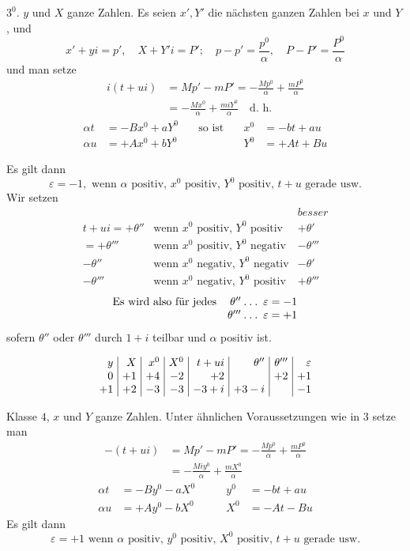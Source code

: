 $3^0$. $y$ und $X$ ganze Zahlen. Es seien $x',Y'$ die nächsten ganzen Zahlen bei $x$ und $Y$, und
\[
x'+yi=p',\quad X+Y'i=P';\quad p-p'=\frac{p^0}{\alpha},\quad P-P'=\frac{P^0}{\alpha}
\]
und man setze
\[
\begin{aligned}
i(t+ui)&=Mp'-mP'=-\frac{Mp^0}{\alpha}+\frac{mP^0}{\alpha}\\
&=-\frac{Mx^0}{\alpha}+\frac{miY^0}{\alpha}\quad\text{d. h.}
\end{aligned}
\]
\[
\begin{alignedat}{3}
\alpha t&=-Bx^0+aY^0\quad&\text{so ist}\quad&x^0&=-bt+au\\
\alpha u&=+Ax^0+bY^0&&Y^0&=+At+Bu
\end{alignedat}
\]

Es gilt dann
\[
\varepsilon=-1,\text{ wenn }\alpha\text{ positiv, }x^0\text{ positiv, }Y^0\text{ positiv, }t+u\text{ gerade usw.}
\]
Wir setzen
\[
\begin{array}{rll}
&&\textit{besser}\\
t+ui=+\theta''&\text{wenn }x^0\text{ positiv, }Y^0\text{ positiv}&+\theta'\\
=+\theta'''&\text{wenn }x^0\text{ positiv, }Y^0\text{ negativ}&-\theta'''\\
-\theta''&\text{wenn }x^0\text{ negativ, }Y^0\text{ negativ}&-\theta'\\
-\theta'''&\text{wenn }x^0\text{ negativ, }Y^0\text{ positiv}&+\theta'''
\end{array}
\]
\[
\begin{array}{lr}
\text{Es wird also für jedes}&\theta''\mathbin{.}\mathbin{.}\mathbin{.}\;\varepsilon=-1\\
&\theta'''\mathbin{.}\mathbin{.}\mathbin{.}\;\varepsilon=+1
\end{array}
\]
sofern $\theta''$ oder $\theta'''$ durch $1+i$ teilbar und $\alpha$ positiv ist.

\[
\setlength{\arraycolsep}{4pt}
\begin{array}{r|r|r|r|r|r|r|r}
y&X&x^0&X^0&t+ui&\theta''&\theta'''&\varepsilon\\
0&+1&+4&-2&+2&&+2&+1\\
+1&+2&-3&-3&-3+i&+3-i&&-1
\end{array}
\]

Klasse $4$, $x$ und $Y$ ganze Zahlen. Unter ähnlichen Voraussetzungen wie in 3 setze man
\[
\begin{aligned}
-(t+ui)&=Mp'-mP'=-\frac{Mp^0}{\alpha}+\frac{mP^0}{\alpha}\\
&=-\frac{Miy^0}{\alpha}+\frac{mX^0}{\alpha}
\end{aligned}
\]
\[
\begin{alignedat}{2}
\alpha t&=-By^0-aX^0\qquad&y^0&=-bt+au\\
\alpha u&=+Ay^0-bX^0&X^0&=-At-Bu
\end{alignedat}
\]
Es gilt dann
\[
\varepsilon=+1\text{ wenn }\alpha\text{ positiv, }y^0\text{ positiv, }X^0\text{ positiv, }t+u\text{ gerade usw.}
\]


